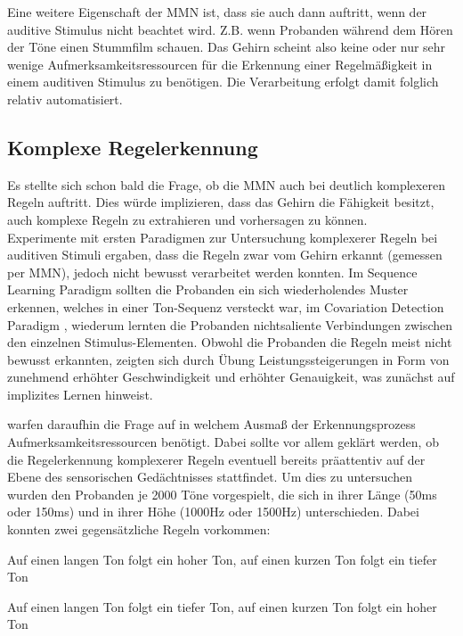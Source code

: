 \documentclass[doc,a4paper,12pt]{apa6}
\begin{document}
Eine weitere Eigenschaft der MMN ist, dass sie auch dann auftritt, wenn der auditive Stimulus nicht beachtet wird. Z.B. wenn Probanden während dem Hören der Töne einen Stummfilm schauen. Das Gehirn scheint also keine oder nur sehr wenige Aufmerksamkeitsressourcen für die Erkennung einer Regelmäßigkeit in einem auditiven Stimulus zu benötigen. Die Verarbeitung erfolgt damit folglich relativ automatisiert.

\subsection{Komplexe Regelerkennung}

Es stellte sich schon bald die Frage, ob die MMN auch bei deutlich komplexeren Regeln auftritt. Dies würde implizieren, dass das Gehirn die Fähigkeit besitzt, auch komplexe Regeln zu extrahieren und vorhersagen zu können.\\
Experimente mit ersten Paradigmen zur Untersuchung komplexerer Regeln bei auditiven Stimuli ergaben, dass die Regeln zwar vom Gehirn erkannt (gemessen per MMN), jedoch nicht bewusst verarbeitet werden konnten. Im Sequence Learning Paradigm \parencite{hoffmann1998implicit} sollten die Probanden ein sich wiederholendes Muster erkennen, welches in einer Ton-Sequenz versteckt war, im Covariation Detection Paradigm \parencite{stamov2001revealing}, wiederum lernten die Probanden nichtsaliente Verbindungen zwischen den einzelnen Stimulus-Elementen. Obwohl die Probanden die Regeln meist nicht bewusst erkannten, zeigten sich durch Übung Leistungssteigerungen in Form von zunehmend erhöhter Geschwindigkeit und erhöhter Genauigkeit, was zunächst auf implizites Lernen hinweist.

\textcite{paavilainen2007preattentive} warfen daraufhin die Frage auf in welchem Ausmaß der Erkennungsprozess Aufmerksamkeitsressourcen benötigt. Dabei sollte vor allem geklärt werden, ob die Regelerkennung komplexerer Regeln eventuell bereits präattentiv auf der Ebene des sensorischen Gedächtnisses stattfindet. Um dies zu untersuchen wurden den Probanden je 2000 Töne vorgespielt, die sich in ihrer Länge (50ms oder 150ms) und in ihrer Höhe (1000Hz oder 1500Hz) unterschieden. Dabei konnten zwei gegensätzliche Regeln vorkommen:

\begin{compactitem}
  \item Auf einen langen Ton folgt ein hoher Ton, auf einen kurzen Ton folgt ein tiefer
Ton
  \item Auf einen langen Ton folgt ein tiefer Ton, auf einen kurzen Ton folgt ein hoher
Ton
\end{compactitem}
\end{document}
